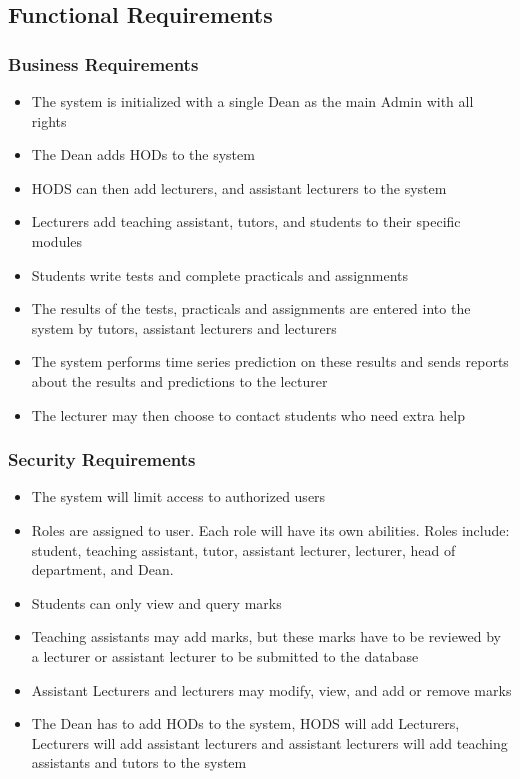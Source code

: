 \documentclass[a4paper,12pt]{article}
\begin{document}
        \subsection{Functional Requirements}
        	\subsubsection{Business Requirements}
        	\begin{itemize}
        	\item The system is initialized with a single Dean as the main Admin with all rights
        	\item The Dean adds HODs to the system
        	\item HODS can then add lecturers, and assistant lecturers to the system
        	\item Lecturers add teaching assistant, tutors, and students to their specific modules
        	\item Students write tests and complete practicals and assignments
        	\item The results of the tests, practicals and assignments are entered into the system by tutors, assistant lecturers and lecturers
        	\item The system performs time series prediction on these results and sends reports about the results and predictions to the lecturer
        	\item The lecturer may then choose to contact students who need extra help
        	\end{itemize}
        	\subsubsection{Security Requirements}
        	\begin{itemize}
        	\item The system will limit access to authorized users
        	\item Roles are assigned to user. Each role will have its own abilities. Roles include: student, teaching assistant, tutor, assistant lecturer, lecturer, head of department, and Dean.
        	\item Students can only view and query marks
        	\item Teaching assistants may add marks, but these marks have to be reviewed by a lecturer or assistant lecturer to be submitted to the database
        	\item Assistant Lecturers and lecturers may modify, view, and add or remove marks
        	\item The Dean has to add HODs to the system, HODS will add Lecturers, Lecturers will add assistant lecturers and assistant lecturers will add teaching assistants and tutors to the system
        	\end{itemize}
        	
\end{document}
